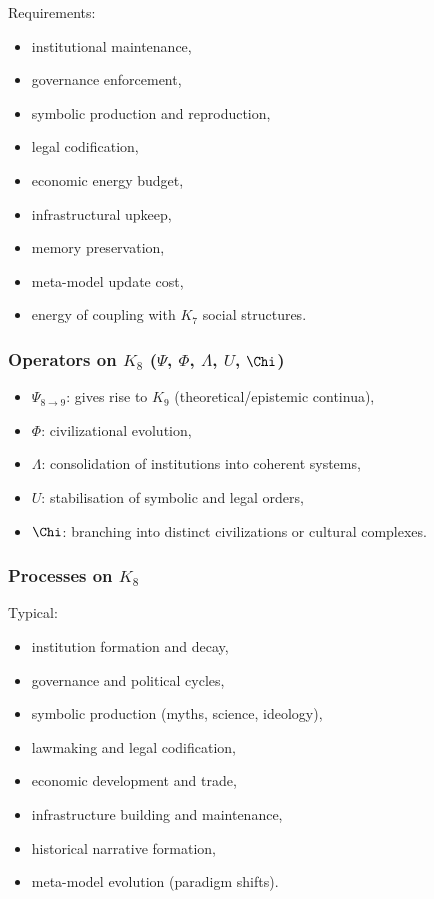 Requirements:
\begin{itemize}
    \item institutional maintenance,
    \item governance enforcement,
    \item symbolic production and reproduction,
    \item legal codification,
    \item economic energy budget,
    \item infrastructural upkeep,
    \item memory preservation,
    \item meta-model update cost,
    \item energy of coupling with $K_7$ social structures.
\end{itemize}

\subsubsection{Operators on \texorpdfstring{$K_8$}{K_8} (\texorpdfstring{$\Psi$}{\Psi}, \texorpdfstring{$\Phi$}{\Phi}, \texorpdfstring{$\Lambda$}{\Lambda}, \texorpdfstring{$U$}{U}, \texorpdfstring{$\Chi$}{\Chi})}

\begin{itemize}
    \item $\Psi_{8\to9}$: gives rise to $K_9$ (theoretical/epistemic continua),
    \item $\Phi$: civilizational evolution,
    \item $\Lambda$: consolidation of institutions into coherent systems,
    \item $U$: stabilisation of symbolic and legal orders,
    \item $\Chi$: branching into distinct civilizations or cultural complexes.
\end{itemize}

\subsubsection{Processes on \texorpdfstring{$K_8$}{K_8}}

Typical:
\begin{itemize}
    \item institution formation and decay,
    \item governance and political cycles,
    \item symbolic production (myths, science, ideology),
    \item lawmaking and legal codification,
    \item economic development and trade,
    \item infrastructure building and maintenance,
    \item historical narrative formation,
    \item meta-model evolution (paradigm shifts).
\end{itemize}

